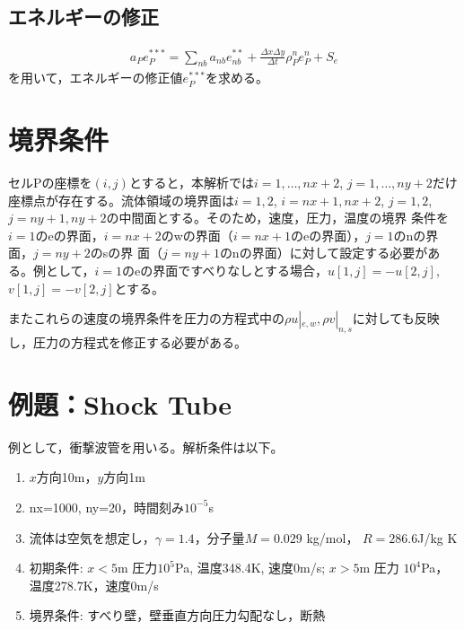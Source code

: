 \documentclass[a4paper,10pt,fleqn,dvipdfmx]{jsarticle}
\begin{document}
\subsection{エネルギーの修正}
\begin{align}
 a_Pe_P^{***} 
= \sum_{nb} a_{nb} e_{nb}^{**} + \frac{\Delta x \Delta y}{\Delta t}\rho^n_P e_P^n
 +S_e
\end{align}
を用いて，エネルギーの修正値$e^{***}_P$を求める。

\section{境界条件}
セルPの座標を$(i,j)$とすると，本解析では$i=1,\dots, nx+2$, $j=1,\dots,
ny+2$だけ座標点が存在する。流体領域の境界面は$i=1,2$, $i=nx+1, nx+2$,
$j=1,2$, $j=ny+1, ny+2$の中間面とする。そのため，速度，圧力，温度の境界
条件を$i=1$のeの界面，$i=nx+2$のwの界面（$i=nx+1$のeの界面），$j=1$のnの界面，$j=ny+2$のsの界
面（$j=ny+1$のnの界面）に対して設定する必要がある。例として，$i=1$のeの界面ですべりなしとする場合，$u[1,j]=-u[2,j]$,
$v[1,j]=-v[2,j]$とする。

またこれらの速度の境界条件を圧力の方程式中の$\rho u|_{e, w},\rho
v|_{n,s}$に対しても反映し，圧力の方程式を修正する必要がある。

\section{例題：Shock Tube}
例として，衝撃波管を用いる。解析条件は以下。
\begin{enumerate}
 \item $x$方向10m，$y$方向1m
 \item nx=1000, ny=20，時間刻み$10^{-5}$s 
 \item 流体は空気を想定し，$\gamma=1.4$，分子量$M=0.029$ kg/mol，
       $R=286.6$J/kg K
 \item 初期条件: $x<5$m 圧力$10^5$Pa, 温度348.4K, 速度0m/s; $x>5$m 圧力
       $10^4$Pa，温度278.7K，速度0m/s
\item 境界条件: すべり壁，壁垂直方向圧力勾配なし，断熱
\end{enumerate}
\end{document}
